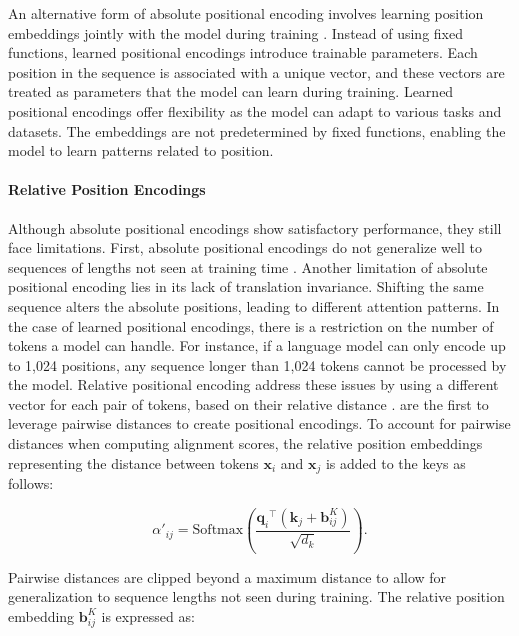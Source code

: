 An alternative form of absolute positional encoding involves learning position embeddings jointly with the model during training \citep{devlin2018bert}. Instead of using fixed functions, learned positional encodings introduce trainable parameters. Each position in the sequence is associated with a unique vector, and these vectors are treated as parameters that the model can learn during training. Learned positional encodings offer flexibility as the model can adapt to various tasks and datasets. The embeddings are not predetermined by fixed functions, enabling the model to learn patterns related to position.

\paragraph{Relative Position Encodings}

Although absolute positional encodings show satisfactory performance, they still face limitations. First, absolute positional encodings do not generalize well to sequences of lengths not seen at training time \citep{dai2019transformer}. Another limitation of absolute positional encoding lies in its lack of translation invariance. Shifting the same sequence alters the absolute positions, leading to different attention patterns. In the case of learned positional encodings,  there is a restriction on the number of tokens a model can handle. For instance, if a language model can only encode up to 1,024 positions, any sequence longer than 1,024 tokens cannot be processed by the model. Relative positional encoding address these issues by using a different vector for each pair of tokens, based on their relative distance \citep{shaw2018self, huang2018music, ke2020rethinking}. \citet{shaw2018self} are the first to leverage pairwise distances to create positional encodings. To account for pairwise distances when computing alignment scores, the relative position embeddings representing the distance between tokens $\bm{x}_i$ and $\bm{x}_j$ is added to the keys as follows:

\begin{equation}
    \alpha'_{ij} = \mathrm{Softmax}\left(\frac{{\bm{q}_i}^{\top} (\bm{k}_j + \bm{b}^K_{ij})}{\sqrt{d_k}}\right).
\end{equation}

\noindent Pairwise distances are clipped beyond a maximum distance to allow for generalization to sequence lengths not seen during training. The relative position embedding $\bm{b}^K_{ij}$ is expressed as:

